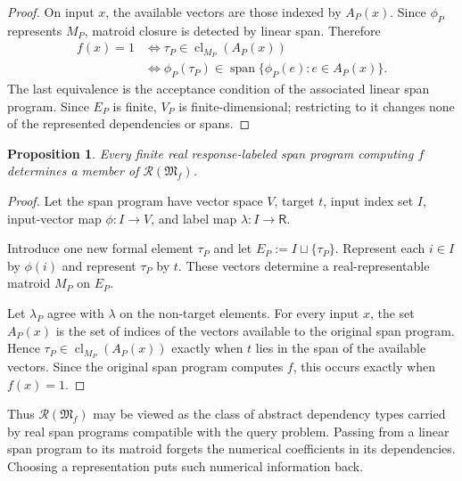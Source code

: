 \documentclass[11pt]{article}
\numberwithin{equation}{section}
\newtheorem{proposition}[definition]{Proposition}
\theoremstyle{remark}
\newcommand{\cl}{\operatorname{cl}}
\begin{document}
\begin{proof}
On input $x$, the available vectors are those indexed by
$A_P(x)$. Since $\phi_P$ represents $M_P$, matroid closure is detected by
linear span. Therefore
\begin{equation}
\begin{aligned}
    f(x)=1
    &\Longleftrightarrow
    \tau_P\in\cl_{M_P}(A_P(x))\\
    &\Longleftrightarrow
    \phi_P(\tau_P)
    \in
    \operatorname{span}
    \{
        \phi_P(e):
        e\in A_P(x)
    \}.
\end{aligned}
\end{equation}
The last equivalence is the acceptance condition of the associated linear span program. Since $E_P$ is finite, $V_P$ is finite-dimensional; restricting to it changes none of the represented dependencies or spans.
\end{proof}

\begin{proposition}
\label{prop:linear-span-program-to-matroid-program}
Every finite real response-labeled span program computing $f$ determines a
member of $\mathscr R(\mathfrak M_f)$.
\end{proposition}

\begin{proof}
Let the span program have vector space $V$, target $t$, input index set $I$,
input-vector map $\phi:I\to V$, and label map
$\lambda:I\to\mathsf R$.

Introduce one new formal element $\tau_P$ and let
$E_P:=I\sqcup\{\tau_P\}$. Represent each $i\in I$ by $\phi(i)$ and
represent $\tau_P$ by $t$. These vectors determine a real-representable
matroid $M_P$ on $E_P$.

Let $\lambda_P$ agree with $\lambda$ on the non-target elements. For every
input $x$, the set $A_P(x)$ is the set of indices of the vectors
available to the original span program. Hence
$\tau_P\in\cl_{M_P}(A_P(x))$ exactly when $t$ lies in the span of the
available vectors. Since the original span program computes $f$, this occurs
exactly when $f(x)=1$.
\end{proof}

Thus $\mathscr R(\mathfrak M_f)$ may be viewed as the class of abstract
dependency types carried by real span programs compatible with the query
problem. Passing from a linear span program to its matroid forgets the
numerical coefficients in its dependencies. Choosing a representation puts
such numerical information back.
\end{document}
